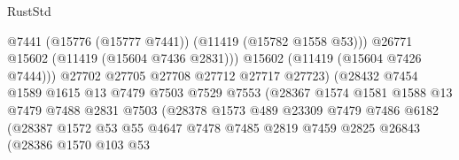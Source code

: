 \begin{lexlean}{RustStd}
\begin{coremodule}
                                            @7441
                                            (@15776 (@15777 @7441))
                                            (@11419 (@15782 @1558 @53)))
                                          @26771
                                          @15602
                                          (@11419 (@15604 @7436 @2831)))
                                        @15602
                                        (@11419 (@15604 @7426 @7444)))
                                      @27702
                                      @27705
                                      @27708
                                      @27712
                                      @27717
                                      @27723)
                                    (@28432
                                      @7454
                                      @1589
                                      @1615
                                      @13
                                      @7479
                                      @7503
                                      @7529
                                      @7553
                                      (@28367
                                        @1574
                                        @1581
                                        @1588
                                        @13
                                        @7479
                                        @7488
                                        @2831
                                        @7503
                                        (@28378
                                          @1573
                                          @489
                                          @23309
                                          @7479
                                          @7486
                                          @6182
                                          (@28387
                                            @1572
                                            @53
                                            @55
                                            @4647
                                            @7478
                                            @7485
                                            @2819
                                            @7459
                                            @2825
                                            @26843
                                            (@28386
                                              @1570
                                              @103
                                              @53

\end{coremodule}
\end{lexlean}
